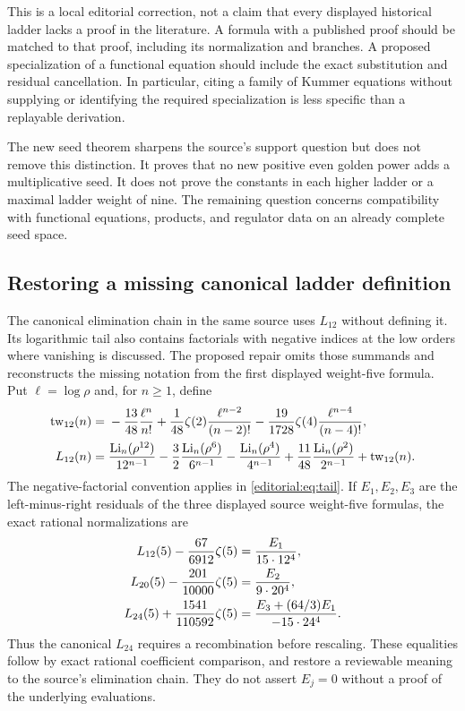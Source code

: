 This is a local editorial correction, not a claim that every displayed
historical ladder lacks a proof in the literature. A formula with a
published proof should be matched to that proof, including its
normalization and branches. A proposed specialization of a functional
equation should include the exact substitution and residual
cancellation. In particular, citing a family of Kummer equations
without supplying or identifying the required specialization is less
specific than a replayable derivation.

The new seed theorem sharpens the source's support question but does
not remove this distinction. It proves that no new positive even
golden power adds a multiplicative seed. It does not prove the
constants in each higher ladder or a maximal ladder weight of nine.
The remaining question concerns compatibility with functional equations,
products, and regulator data on an already complete seed space.

\subsection{Restoring a missing canonical ladder definition}
The canonical elimination chain in the same source uses \(L_{12}\)
without defining it. Its logarithmic tail also contains factorials
with negative indices at the low orders where vanishing is discussed.
The proposed repair omits those summands and reconstructs the missing
notation from the first displayed weight-five formula.
Put \(\ell=\log\rho\) and, for \(n\ge1\), define
\begin{align}
 \mathrm{tw}_{12}(n)={}&-\frac{13}{48}\frac{\ell^n}{n!}
 +\frac1{48}\zeta(2)\frac{\ell^{n-2}}{(n-2)!}
 -\frac{19}{1728}\zeta(4)\frac{\ell^{n-4}}{(n-4)!},
 \label{editorial:eq:tail}\\
 L_{12}(n)={}&\frac{\operatorname{Li}_n(\rho^{12})}{12^{n-1}}
 -\frac32\frac{\operatorname{Li}_n(\rho^6)}{6^{n-1}}
 -\frac{\operatorname{Li}_n(\rho^4)}{4^{n-1}}
 +\frac{11}{48}\frac{\operatorname{Li}_n(\rho^2)}{2^{n-1}}
 +\mathrm{tw}_{12}(n).
 \label{editorial:eq:L12}
\end{align}
The negative-factorial convention applies in \eqref{editorial:eq:tail}.
If \(E_1,E_2,E_3\) are the left-minus-right residuals of the
three displayed source weight-five formulas, the exact rational
normalizations are
\begin{align}
 L_{12}(5)-\frac{67}{6912}\zeta(5)
    &=\frac{E_1}{15\cdot12^4},\notag\\
 L_{20}(5)-\frac{201}{10000}\zeta(5)
    &=\frac{E_2}{9\cdot20^4},\label{editorial:eq:normalization}\\
 L_{24}(5)+\frac{1541}{110592}\zeta(5)
    &=\frac{E_3+(64/3)E_1}{-15\cdot24^4}.\notag
\end{align}
Thus the canonical \(L_{24}\) requires a recombination before
rescaling. These equalities follow by exact rational coefficient
comparison, and restore a reviewable meaning to the source's
elimination chain. They do not assert \(E_j=0\) without a proof
of the underlying evaluations.

